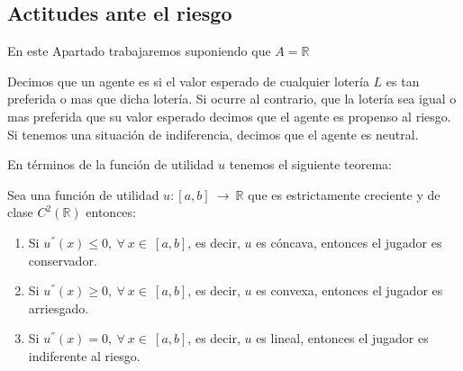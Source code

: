 \documentclass[12pt,a4paper,]{book}
\numberwithin{dummy}{section}
\theoremstyle{ocrenumbox}
\theoremstyle{blacknumex}
\theoremstyle{blacknumbox}
\theoremstyle{ocrenum}
\theoremstyle{ocrenum}
\begin{document}
\hypertarget{Seccion141}{%
\subsection{Actitudes ante el riesgo}\label{Seccion141}}

En este Apartado trabajaremos suponiendo que \(A=\mathbb{R}\)

Decimos que un agente es si el valor esperado de cualquier lotería \(L\)
es tan preferida o mas que dicha lotería. Si ocurre al contrario, que la
lotería sea igual o mas preferida que su valor esperado decimos que el
agente es propenso al riesgo. Si tenemos una situación de indiferencia,
decimos que el agente es neutral.

En términos de la función de utilidad \(u\) tenemos el siguiente
teorema:

Sea una función de utilidad \(u: [a,b] \ \rightarrow \ \mathbb{R}\) que
es estrictamente creciente y de clase \(C^2(\mathbb{R})\) entonces:

\begin{enumerate}
\def\labelenumi{\arabic{enumi}.}
\item
  Si \(u^{''}(x) \leq 0, \ \forall \ x \in \ [a,b]\), es decir, \(u\) es
  cóncava, entonces el jugador es conservador.
\item
  Si \(u^{''}(x) \geq 0, \ \forall \ x \in \ [a,b]\), es decir, \(u\) es
  convexa, entonces el jugador es arriesgado.
\item
  Si \(u^{''}(x) = 0, \ \forall \ x \in \ [a,b]\), es decir, \(u\) es
  lineal, entonces el jugador es indiferente al riesgo.
\end{enumerate}




%
\end{document}
